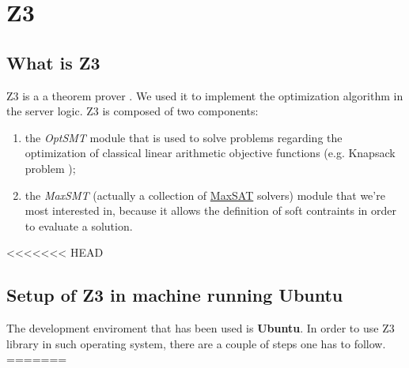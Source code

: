 \section{Z3}\label{Z3}
\subsection{What is Z3}
Z3 is a a theorem prover \cite{z3}. We used it to implement the optimization algorithm in the server logic. Z3 is composed of two components:
\begin{enumerate}
  \item the \textit{OptSMT} module that is used to solve problems regarding the optimization of classical linear arithmetic objective functions (e.g. Knapsack problem \cite{knapsack});
  \item the \textit{MaxSMT} (actually a collection of \underline{MaxSAT} solvers) module that we're most interested in, because it allows the definition of soft contraints in order to evaluate a solution.
\end{enumerate}


<<<<<<< HEAD
\subsection{Setup of Z3 in machine running Ubuntu}\label{SubSec:Z3Setup}
The development enviroment that has been used is \textbf{Ubuntu}. In order to use Z3 library in such operating system, there are a couple of steps one has to follow.
=======
